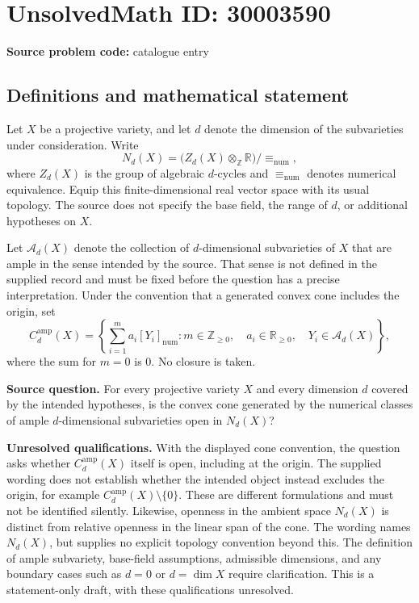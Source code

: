 \documentclass[11pt]{article}
\newcommand{\Z}{\mathbb{Z}}
\newcommand{\R}{\mathbb{R}}
\begin{document}
\section*{UnsolvedMath ID: 30003590}
\textbf{Source problem code:} catalogue entry
\subsection{Definitions and mathematical statement}
Let \(X\) be a projective variety, and let \(d\) denote the dimension of the subvarieties under consideration. Write
\[
N_d(X)=\bigl(Z_d(X)\otimes_{\Z}\R\bigr)/\!\equiv_{\mathrm{num}},
\]
where \(Z_d(X)\) is the group of algebraic \(d\)-cycles and \(\equiv_{\mathrm{num}}\) denotes numerical equivalence. Equip this finite-dimensional real vector space with its usual topology. The source does not specify the base field, the range of \(d\), or additional hypotheses on \(X\).

Let \(\mathcal A_d(X)\) denote the collection of \(d\)-dimensional subvarieties of \(X\) that are ample in the sense intended by the source. That sense is not defined in the supplied record and must be fixed before the question has a precise interpretation. Under the convention that a generated convex cone includes the origin, set
\[
C_d^{\mathrm{amp}}(X)=
\left\{\sum_{i=1}^{m}a_i[Y_i]_{\mathrm{num}}:
 m\in\Z_{\geq 0},\quad a_i\in\R_{\geq 0},\quad
 Y_i\in\mathcal A_d(X)\right\},
\]
where the sum for \(m=0\) is \(0\). No closure is taken.

\textbf{Source question.} For every projective variety \(X\) and every dimension \(d\) covered by the intended hypotheses, is the convex cone generated by the numerical classes of ample \(d\)-dimensional subvarieties open in \(N_d(X)\)?

\textbf{Unresolved qualifications.} With the displayed cone convention, the question asks whether \(C_d^{\mathrm{amp}}(X)\) itself is open, including at the origin. The supplied wording does not establish whether the intended object instead excludes the origin, for example \(C_d^{\mathrm{amp}}(X)\setminus\{0\}\). These are different formulations and must not be identified silently. Likewise, openness in the ambient space \(N_d(X)\) is distinct from relative openness in the linear span of the cone. The wording names \(N_d(X)\), but supplies no explicit topology convention beyond this. The definition of ample subvariety, base-field assumptions, admissible dimensions, and any boundary cases such as \(d=0\) or \(d=\dim X\) require clarification. This is a statement-only draft, with these qualifications unresolved.
\end{document}
